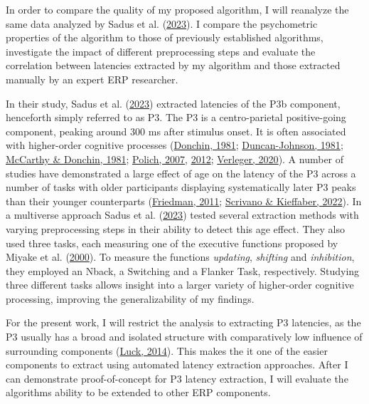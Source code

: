 \documentclass[
  man]{apa7}
\begin{document}
In order to compare the quality of my proposed algorithm, I will reanalyze the same data analyzed by Sadus et al. (\protect\hyperlink{ref-sadus2023multiverse}{2023}). I compare the psychometric properties of the algorithm to those of previously established algorithms, investigate the impact of different preprocessing steps and evaluate the correlation between latencies extracted by my algorithm and those extracted manually by an expert ERP researcher.

In their study, Sadus et al. (\protect\hyperlink{ref-sadus2023multiverse}{2023}) extracted latencies of the P3b component, henceforth simply referred to as P3. The P3 is a centro-parietal positive-going component, peaking around 300 ms after stimulus onset. It is often associated with higher-order cognitive processes (\protect\hyperlink{ref-donchin1981surprise}{Donchin, 1981}; \protect\hyperlink{ref-duncan1981young}{Duncan-Johnson, 1981}; \protect\hyperlink{ref-mccarthy1981metric}{McCarthy \& Donchin, 1981}; \protect\hyperlink{ref-polich2007updating}{Polich, 2007}, \protect\hyperlink{ref-polich2012neuropsychology}{2012}; \protect\hyperlink{ref-verleger2020effects}{Verleger, 2020}). A number of studies have demonstrated a large effect of age on the latency of the P3 across a number of tasks with older participants displaying systematically later P3 peaks than their younger counterparts (\protect\hyperlink{ref-friedman2012components}{Friedman, 2011}; \protect\hyperlink{ref-scrivano2022behavioral}{Scrivano \& Kieffaber, 2022}). In a multiverse approach Sadus et al. (\protect\hyperlink{ref-sadus2023multiverse}{2023}) tested several extraction methods with varying preprocessing steps in their ability to detect this age effect. They also used three tasks, each measuring one of the executive functions proposed by Miyake et al. (\protect\hyperlink{ref-miyake2000unity}{2000}). To measure the functions \emph{updating}, \emph{shifting} and \emph{inhibition}, they employed an Nback, a Switching and a Flanker Task, respectively. Studying three different tasks allows insight into a larger variety of higher-order cognitive processing, improving the generalizability of my findings.

For the present work, I will restrict the analysis to extracting P3 latencies, as the P3 usually has a broad and isolated structure with comparatively low influence of surrounding components (\protect\hyperlink{ref-luck2014introduction}{Luck, 2014}). This makes the it one of the easier components to extract using automated latency extraction approaches. After I can demonstrate proof-of-concept for P3 latency extraction, I will evaluate the algorithms ability to be extended to other ERP components.
\end{document}
